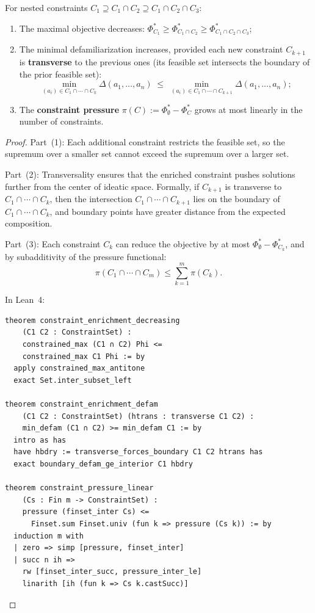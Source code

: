 \begin{theorem}
\label{thm:constraint-enrichment}
For nested constraints $C_1 \supseteq C_1 \cap C_2 \supseteq
C_1 \cap C_2 \cap C_3$:
\begin{enumerate}
  \item The maximal objective decreases:
    $\Phi^\ast_{C_1} \geq \Phi^\ast_{C_1 \cap C_2}
     \geq \Phi^\ast_{C_1 \cap C_2 \cap C_3}$;
  \item The minimal defamiliarization increases, provided each new constraint
    $C_{k+1}$ is \textbf{transverse} to the previous ones (its feasible set
    intersects the boundary of the prior feasible set):
    \[
      \min_{(a_i) \in C_1 \cap \cdots \cap C_k}
      \Delta(a_1, \ldots, a_n) \;\leq\;
      \min_{(a_i) \in C_1 \cap \cdots \cap C_{k+1}}
      \Delta(a_1, \ldots, a_n);
    \]
  \item The \textbf{constraint pressure}
    $\pi(C) := \Phi^\ast_\emptyset - \Phi^\ast_C$ grows at most
    linearly in the number of constraints.
\end{enumerate}
\end{theorem}

\begin{proof}
Part~(1): Each additional constraint restricts the feasible set, so the
supremum over a smaller set cannot exceed the supremum over a larger set.

Part~(2): Transversality ensures that the enriched constraint pushes solutions
further from the center of ideatic space.  Formally, if $C_{k+1}$ is transverse
to $C_1 \cap \cdots \cap C_k$, then the intersection
$C_1 \cap \cdots \cap C_{k+1}$ lies on the boundary of $C_1 \cap \cdots \cap
C_k$, and boundary points have greater distance from the expected composition.

Part~(3): Each constraint $C_k$ can reduce the objective by at most
$\Phi^\ast_\emptyset - \Phi^\ast_{C_k}$, and by subadditivity of the pressure
functional:
\[
  \pi(C_1 \cap \cdots \cap C_m) \leq \sum_{k=1}^{m} \pi(C_k).
\]

In Lean~4:
\begin{lstlisting}
theorem constraint_enrichment_decreasing
    (C1 C2 : ConstraintSet) :
    constrained_max (C1 ∩ C2) Phi <=
    constrained_max C1 Phi := by
  apply constrained_max_antitone
  exact Set.inter_subset_left

theorem constraint_enrichment_defam
    (C1 C2 : ConstraintSet) (htrans : transverse C1 C2) :
    min_defam (C1 ∩ C2) >= min_defam C1 := by
  intro as has
  have hbdry := transverse_forces_boundary C1 C2 htrans has
  exact boundary_defam_ge_interior C1 hbdry

theorem constraint_pressure_linear
    (Cs : Fin m -> ConstraintSet) :
    pressure (finset_inter Cs) <=
      Finset.sum Finset.univ (fun k => pressure (Cs k)) := by
  induction m with
  | zero => simp [pressure, finset_inter]
  | succ n ih =>
    rw [finset_inter_succ, pressure_inter_le]
    linarith [ih (fun k => Cs k.castSucc)]
\end{lstlisting}
\end{proof}

